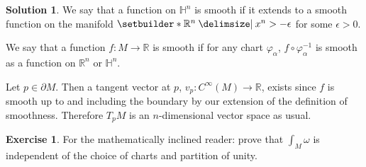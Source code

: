 \documentclass[11pt, a4paper]{report}
\theoremstyle{definition}
\newtheorem{exercise}{Exercise}[part]
\newtheorem{solution}{Solution}[part]
\newenvironment{ex}{\begin{exercise}}{\end{exercise}\pagebreak[1]}
\newenvironment{sol}{\begin{solution}}{\end{solution}\pagebreak[3]}
\begin{document}
\begin{sol}

We say that a function on $\mathbb{H}^n$ is smooth if it extends to a smooth function on the manifold $\setbuilder*{\mathbb{R}^n \given x^n > -\epsilon}$ for some $\epsilon > 0$.

We say that a function $f: M \to \mathbb{R}$ is smooth if for any chart $\varphi_\alpha$, $f \circ \varphi_\alpha^{-1}$ is smooth as a function on $\mathbb{R}^n$ or $\mathbb{H}^n$.

Let $p \in \partial M$. Then a tangent vector at $p$, $v_p: C^\infty(M) \to \mathbb{R}$, exists since $f$ is smooth up to and including the boundary by our extension of the definition of smoothness. Therefore $T_p M$ is an $n$-dimensional vector space as usual.

\end{sol}

\begin{ex}

For the mathematically inclined reader: prove that $\int_M \omega$ is independent of the choice of charts and partition of unity.

\end{ex}
\end{document}
